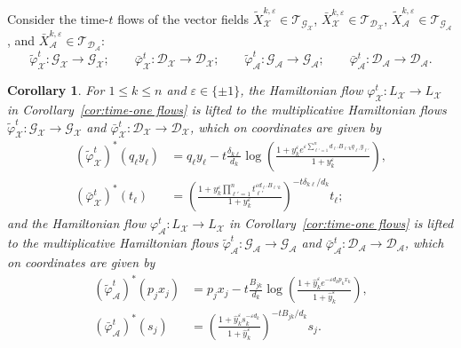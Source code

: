 \documentclass{amsart}
\newtheorem{corollary}[theorem]{Corollary}
\numberwithin{equation}{section}
\newcommand{\cA}{\mathcal{A}}
\newcommand{\cG}{\mathcal{G}}
\renewcommand{\cD}{\mathcal{D}}
\newcommand{\cX}{\mathcal{X}}
\newcommand{\cT}{\mathcal{T}}
\begin{document}
Consider the time-$t$ flows of the vector fields $\tilde X_\cX^{k,\varepsilon}\in\cT_{\cG_\cX}$, $\bar X_\cX^{k,\varepsilon}\in\cT_{\cD_\cX}$, $\tilde X_\cA^{k,\varepsilon}\in\cT_{\cG_\cA}$, and $\bar X_\cA^{k,\varepsilon}\in\cT_{\cD_\cA}$:
\[
  \tilde\varphi_\cX^t:\cG_\cX\to\cG_\cX;\qquad
  \bar\varphi_\cX^t:\cD_\cX\to\cD_\cX;\qquad
  \tilde\varphi_\cA^t:\cG_\cA\to\cG_\cA;\qquad
  \bar\varphi_\cA^t:\cD_\cA\to\cD_\cA.
\]
\begin{corollary}
  For $1\le k\le n$ and $\varepsilon\in\{\pm1\}$, the Hamiltonian flow $\varphi_\cX^t: L_\cX \to L_\cX$ in Corollary~\ref{cor:time-one flows} is lifted to the multiplicative Hamiltonian flows $\tilde\varphi_\cX^t: \cG_\cX \to \cG_\cX$ and $\bar\varphi_\cX^t: \cD_\cX \to \cD_\cX$, which on coordinates are given by
  \begin{align*}
    (\tilde\varphi_\cX^t)^*(q_\ell y_\ell)&=q_\ell y_\ell-t\frac{\delta_{k\ell}}{d_k}\log\left(\frac{1+y_k^\varepsilon e^{\varepsilon\sum_{\ell'=1}^n d_{\ell'} B_{\ell' k}q_{\ell'} y_{\ell'}}}{1+y_k^\varepsilon}\right),\\
    (\bar\varphi_\cX^t)^*(t_\ell)&=\left(\frac{1+y_k^\varepsilon \prod_{\ell'=1}^n t_{\ell'}^{\varepsilon d_{\ell'} B_{\ell' k}}}{1+y_k^\varepsilon}\right)^{-t\delta_{k\ell}/d_k}t_\ell;
  \end{align*}
  and the Hamiltonian flow $\varphi_\cA^t: L_\cX \to L_\cX$ in Corollary~\ref{cor:time-one flows} is lifted  to the multiplicative Hamiltonian flows $\tilde\varphi_\cA^t: \cG_\cA \to \cG_\cA$ and $\bar\varphi_\cA^t: \cD_\cA \to \cD_\cA$, which on coordinates are given by
  \begin{align*}
    (\tilde\varphi_\cA^t)^*(p_jx_j)&=p_jx_j-t\frac{B_{jk}}{d_k}\log\left(\frac{1+\hat y_k^\varepsilon e^{-\varepsilon d_kp_kx_k}}{1+\hat y_k^\varepsilon}\right), \\
    (\bar\varphi_\cA^t)^*(s_j)&=\left(\frac{1+\hat y_k^\varepsilon s_k^{-\varepsilon d_k}}{1+\hat y_k^\varepsilon}\right)^{-tB_{jk}/d_k}s_j.
  \end{align*}
\end{corollary}
\end{document}
